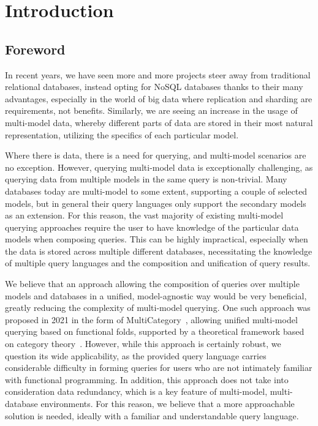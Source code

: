 \chapter*{Introduction}

\section*{Foreword}

In recent years, we have seen more and more projects steer away from traditional relational databases, instead opting for NoSQL databases thanks to their many advantages, especially in the world of big data where replication and sharding are requirements, not benefits.
Similarly, we are seeing an increase in the usage of multi-model data, whereby different parts of data are stored in their most natural representation, utilizing the specifics of each particular model.

Where there is data, there is a need for querying, and multi-model scenarios are no exception.
However, querying multi-model data is exceptionally challenging, as querying data from multiple models in the same query is non-trivial.
Many databases today are multi-model to some extent, supporting a couple of selected models, but in general their query languages only support the secondary models as an extension.
For this reason, the vast majority of existing multi-model querying approaches require the user to have knowledge of the particular data models when composing queries.
This can be highly impractical, especially when the data is stored across multiple different databases, necessitating the knowledge of multiple query languages and the composition and unification of query results.

We believe that an approach allowing the composition of queries over multiple models and databases in a unified, model-agnostic way would be very beneficial, greatly reducing the complexity of multi-model querying.
One such approach was proposed in 2021 in the form of MultiCategory~\cite{multicategory}, allowing unified multi-model querying based on functional folds, supported by a theoretical framework based on category theory~\cite{multicategory_theory}.
However, while this approach is certainly robust, we question its wide applicability, as the provided query language carries considerable difficulty in forming queries for users who are not intimately familiar with functional programming.
In addition, this approach does not take into consideration data redundancy, which is a key feature of multi-model, multi-database environments.
For this reason, we believe that a more approachable solution is needed, ideally with a familiar and understandable query language.

